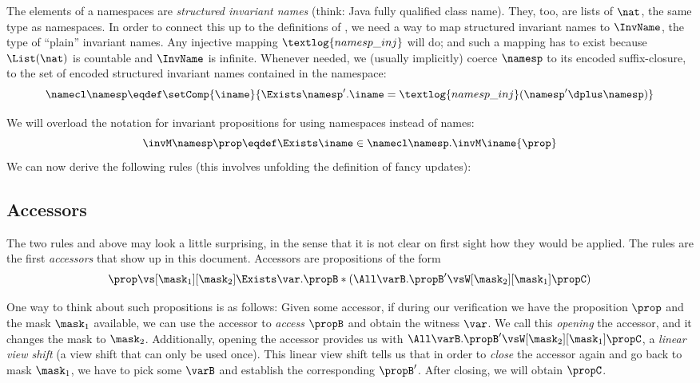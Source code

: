 The elements of a namespaces are \emph{structured invariant names} (think: Java fully qualified class name).
They, too, are lists of $\nat$, the same type as namespaces.
In order to connect this up to the definitions of , we need a way to map structured invariant names to $\InvName$, the type of ``plain'' invariant names.
Any injective mapping $\textlog{namesp\_inj}$ will do; and such a mapping has to exist because $\List(\nat)$ is countable and $\InvName$ is infinite.
Whenever needed, we (usually implicitly) coerce $\namesp$ to its encoded suffix-closure, \ie to the set of encoded structured invariant names contained in the namespace: \[\namecl\namesp \eqdef \setComp{\iname}{\Exists \namesp'. \iname = \textlog{namesp\_inj}(\namesp' \dplus \namesp)}\]

We will overload the notation for invariant propositions for using namespaces instead of names:
\[ \invM\namesp\prop \eqdef \Exists \iname \in \namecl\namesp. \invM\iname{\prop} \]
We can now derive the following rules (this involves unfolding the definition of fancy updates):

\subsection{Accessors}

The two rules  and  above may look a little surprising, in the sense that it is not clear on first sight how they would be applied.
The rules are the first \emph{accessors} that show up in this document.
Accessors are propositions of the form
\[ \prop \vs[\mask_1][\mask_2] \Exists\var. \propB * (\All\varB. \propB' \vsW[\mask_2][\mask_1] \propC) \]

One way to think about such propositions is as follows:
Given some accessor, if during our verification we have the proposition $\prop$ and the mask $\mask_1$ available, we can use the accessor to \emph{access} $\propB$ and obtain the witness $\var$.
We call this \emph{opening} the accessor, and it changes the mask to $\mask_2$.
Additionally, opening the accessor provides us with $\All\varB. \propB' \vsW[\mask_2][\mask_1] \propC$, a \emph{linear view shift} (\ie a view shift that can only be used once).
This linear view shift tells us that in order to \emph{close} the accessor again and go back to mask $\mask_1$, we have to pick some $\varB$ and establish the corresponding $\propB'$.
After closing, we will obtain $\propC$.

